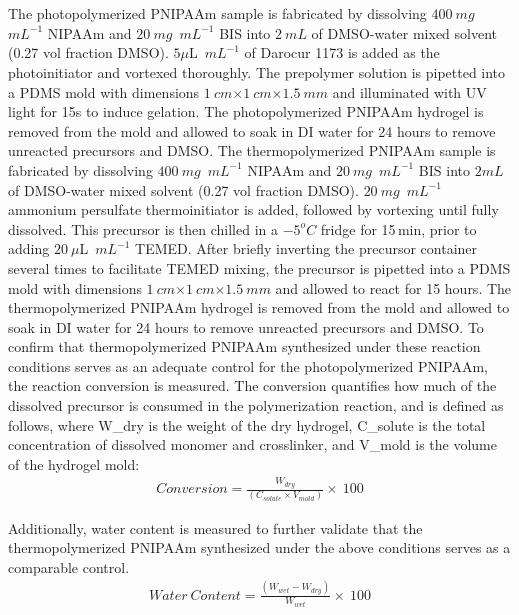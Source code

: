 \section{}
\label{sec:photoThermo}
The photopolymerized PNIPAAm sample is fabricated by dissolving $400~mg$~$mL^{-1}$ NIPAAm and $20~mg$~$mL^{-1}$ BIS into $2~mL$ of DMSO-water mixed solvent (0.27 vol fraction DMSO). $5\mu$L~$mL^{-1}$ of Darocur 1173 is added as the photoinitiator and vortexed thoroughly. The prepolymer solution is pipetted into a PDMS mold with dimensions $1~cm$$\times$$1~cm$$\times$$1.5~mm$ and illuminated with UV light for 15s to induce gelation. The photopolymerized PNIPAAm hydrogel is removed from the mold and allowed to soak in DI water for 24 hours to remove unreacted precursors and DMSO. The thermopolymerized PNIPAAm sample is fabricated by dissolving $400~mg$~$mL^{-1}$ NIPAAm and $20~mg$~$mL^{-1}$ BIS into $2mL$ of DMSO-water mixed solvent (0.27 vol fraction DMSO). $20~mg$~$mL^{-1}$ ammonium persulfate thermoinitiator is added, followed by vortexing until fully dissolved. This precursor is then chilled in a $-5^{o}C$ fridge for 15\,min, prior to adding $20~\mu$L~$mL^{-1}$ TEMED. After briefly inverting the precursor container several times to facilitate TEMED mixing, the precursor is pipetted into a PDMS mold with dimensions $1~cm$$\times$$1~cm$$\times$$1.5~mm$ and allowed to react for 15 hours. The thermopolymerized PNIPAAm hydrogel is removed from the mold and allowed to soak in DI water for 24 hours to remove unreacted precursors and DMSO.
To confirm that thermopolymerized PNIPAAm synthesized under these reaction conditions serves as an adequate control for the photopolymerized PNIPAAm, the reaction conversion is measured. The conversion quantifies how much of the dissolved precursor is consumed in the polymerization reaction, and is defined as follows, where W_dry  is the weight of the dry hydrogel, C_solute  is the total concentration of dissolved monomer and crosslinker, and V_mold  is the volume of the hydrogel mold:
\begin{align}
	Conversion = \frac{W_{dry}}{(C_{solute}×V_{mold} )}\times~100
\end{align}

Additionally, water content is measured to further validate that the thermopolymerized PNIPAAm synthesized under the above conditions serves as a comparable control. 
\begin{align}
	Water~Content = \frac{(W_{wet}-W_{dry})}{W_{wet}}\times~100
\end{align}

